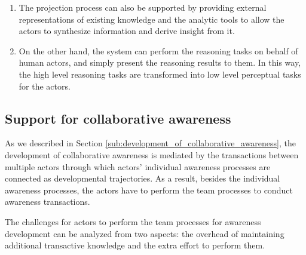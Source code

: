 \begin{enumerate}
   \item The projection process can also be supported by providing external representations of existing knowledge and the analytic tools to allow the actors to synthesize information and derive insight from it.
   \item On the other hand, the system can perform the reasoning tasks on behalf of human actors, and simply present the reasoning results to them. In this way, the high level reasoning tasks are transformed into low level perceptual tasks for the actors.
\end{enumerate}
\subsection{Support for collaborative awareness} %
\label{sub:support_for_collaborative_awareness}
As we described in Section \ref{sub:development_of_collaborative_awareness}, the development of collaborative awareness is mediated by the transactions between multiple actors through which actors' individual awareness processes are connected as developmental trajectories. As a result, besides the individual awareness processes, the actors have to perform the team processes to conduct awareness transactions.

The challenges for actors to perform the team processes for awareness development can be analyzed from two aspects: the overhead of maintaining additional transactive knowledge and the extra effort to perform them. 

